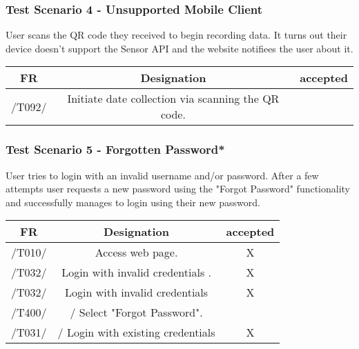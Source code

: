 \subsubsection{Test Scenario 4 - Unsupported Mobile Client}
User scans the QR code they received to begin recording data. It turns out their device
doesn't support the Sensor API and the website notifiees the user about it.
\begin{table}[h]
\begin{tabular}{!{\VRule}c!{\VRule}c!{\VRule}c!{\VRule}}
\hline
FR     & Designation                                                                    &accepted                \\
\hline
 /T092/ &  Initiate date collection via scanning the QR code. &   {\color[HTML]{67FD9A} } \\
 \hline


\end{tabular}
\end{table}
\clearpage
\subsubsection{Test Scenario 5 - Forgotten Password*}
User tries to login with an invalid username and/or password. After a few attempts
user requests a new password using the "Forgot Password" functionality and successfully
manages to login using their new password.

\begin{table}[h]
\begin{tabular}{!{\VRule}c!{\VRule}c!{\VRule}c!{\VRule}}
\hline
FR     & Designation                                                                   &accepted                \\
\hline
/T010/ & Access web page.                                                             &  X {\color[HTML]{67FD9A} } \\
\hline
/T032/ & Login with invalid credentials                               .                                                 &  X {\color[HTML]{67FD9A} } \\
\hline
/T032/ & Login with invalid credentials                                                 &  X {\color[HTML]{67FD9A} }                \\
\hline
 /T400/ &  / Select "Forgot Password".&  {\color[HTML]{67FD9A} } \\
 \hline
  /T031/ &  /  Login with existing credentials&   X {\color[HTML]{67FD9A} } \\
  \hline

\end{tabular}
\end{table}


